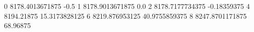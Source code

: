 0 8178.4013671875 -0.5
1 8178.9013671875 0.0
2 8178.7177734375 -0.18359375
4 8194.21875 15.3173828125
6 8219.876953125 40.9755859375
8 8247.8701171875 68.96875
